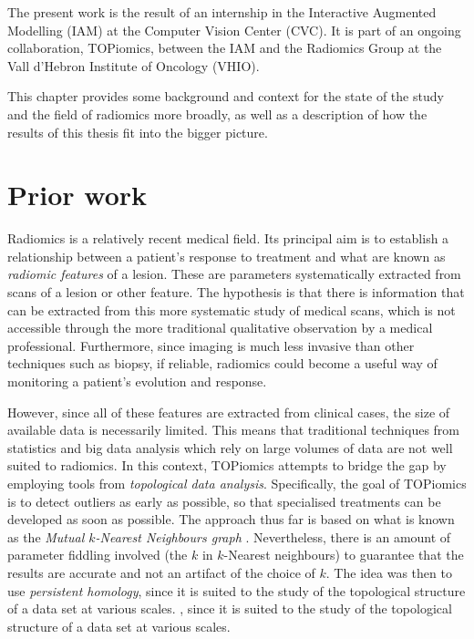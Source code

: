 \documentclass[../main.tex]{subfiles}
\begin{document}
The present work is the result of an internship in the Interactive Augmented Modelling
(IAM) at the Computer Vision Center (CVC). It is part of an ongoing collaboration,
TOPiomics, between the IAM and the Radiomics Group at the Vall d'Hebron Institute of
Oncology (VHIO).  

This chapter provides some background and context for the state of the study and the
field of radiomics more broadly, as well as a description of how the results of this
thesis fit into the bigger picture. 

\section{Prior work}
Radiomics is a relatively recent medical field. Its principal aim is to establish a
relationship between a patient's response to treatment and what are known as
\emph{radiomic features} of a lesion. These are parameters systematically extracted from
scans of a lesion or other feature. The hypothesis is that there is information
that can be extracted from this more systematic study of medical scans, which is not
accessible through the more traditional qualitative observation by a medical professional.
Furthermore, since imaging is much less invasive than other techniques such as biopsy, if
reliable, radiomics could become a useful way of monitoring a patient's evolution and
response. 

However, since all of these features are extracted from clinical cases, the size of
available data is necessarily limited. This means that traditional techniques
from statistics and big data analysis which rely on large volumes of data are not well
suited to radiomics. In this context, TOPiomics \cite{topiomics, attract} attempts to
bridge the gap by employing tools from \emph{topological data analysis}. Specifically, the
goal of TOPiomics is to detect outliers as early as possible, so that specialised
treatments can be developed as soon as possible. The approach thus far is based on what is
known as the \emph{Mutual \( k \)-Nearest Neighbours graph} \cite{outliers}. Nevertheless,
there is an amount of parameter fiddling involved (the \( k \) in \( k \)-Nearest
neighbours)	to guarantee that the results are accurate and not an artifact of the choice
of \( k \). The idea was then to use \emph{persistent homology}, since it is suited to the
study of the topological structure of a data set at various scales. , since it is suited
to the study of the topological structure of a data set at various scales. 
\end{document}
